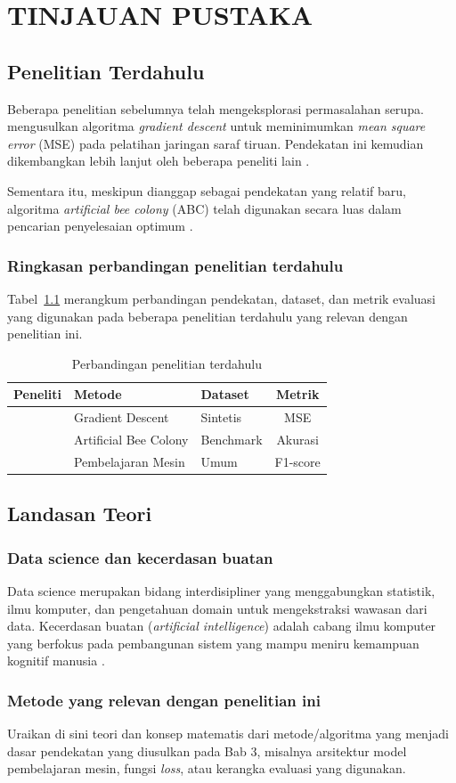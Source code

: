 \chapter{TINJAUAN PUSTAKA}

\section{Penelitian Terdahulu}
Beberapa penelitian sebelumnya telah mengeksplorasi permasalahan serupa. \citet{riedmiller1994} mengusulkan algoritma \textit{gradient descent} untuk meminimumkan \textit{mean square error} (MSE) pada pelatihan jaringan saraf tiruan. Pendekatan ini kemudian dikembangkan lebih lanjut oleh beberapa peneliti lain \citep{calvert2005,aaron2014}.

Sementara itu, meskipun dianggap sebagai pendekatan yang relatif baru, algoritma \textit{artificial bee colony} (ABC) telah digunakan secara luas dalam pencarian penyelesaian optimum \citep{shukran2011}.

\subsection{Ringkasan perbandingan penelitian terdahulu}
Tabel~\ref{tab:perbandingan} merangkum perbandingan pendekatan, dataset, dan metrik evaluasi yang digunakan pada beberapa penelitian terdahulu yang relevan dengan penelitian ini.

\begin{table}[H]
\centering
\caption{Perbandingan penelitian terdahulu}
\label{tab:perbandingan}
\begin{tabular}{|l|l|l|c|}
\hline
Peneliti & Metode & Dataset & Metrik \\
\hline
\citet{riedmiller1994} & Gradient Descent & Sintetis & MSE \\
\hline
\citet{shukran2011}    & Artificial Bee Colony & Benchmark & Akurasi \\
\hline
\citet{russell2020}    & Pembelajaran Mesin & Umum & F1-score \\
\hline
\end{tabular}
\end{table}

\section{Landasan Teori}

\subsection{Data science dan kecerdasan buatan}
Data science merupakan bidang interdisipliner yang menggabungkan statistik, ilmu komputer, dan pengetahuan domain untuk mengekstraksi wawasan dari data. Kecerdasan buatan (\textit{artificial intelligence}) adalah cabang ilmu komputer yang berfokus pada pembangunan sistem yang mampu meniru kemampuan kognitif manusia \citep{russell2020}.

\subsection{Metode yang relevan dengan penelitian ini}
Uraikan di sini teori dan konsep matematis dari metode/algoritma yang menjadi dasar pendekatan yang diusulkan pada Bab 3, misalnya arsitektur model pembelajaran mesin, fungsi \textit{loss}, atau kerangka evaluasi yang digunakan.
